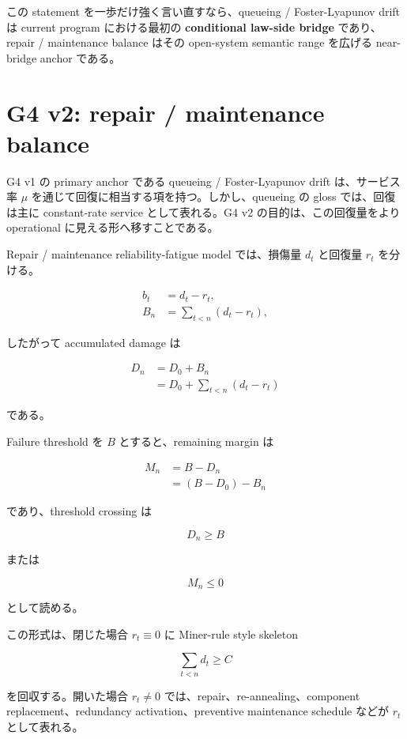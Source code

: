 \documentclass[12pt,a4paper]{article}
\begin{document}
この statement を一歩だけ強く言い直すなら、queueing / Foster-Lyapunov drift は current program における最初の \textbf{conditional law-side bridge} であり、repair / maintenance balance はその open-system semantic range を広げる near-bridge anchor である。

\section{G4 v2: repair / maintenance balance}\label{g4-v2-repair-maintenance-balance}

G4 v1 の primary anchor である queueing / Foster-Lyapunov drift は、サービス率 \(\mu\) を通じて回復に相当する項を持つ。しかし、queueing の gloss では、回復は主に constant-rate service として表れる。G4 v2 の目的は、この回復量をより operational に見える形へ移すことである。

Repair / maintenance reliability-fatigue model では、損傷量 \(d_{t}\) と回復量 \(r_{t}\) を分ける。

\[
\begin{aligned}
b_{t}&=d_{t}-r_{t},\qquad \\
B_{n}&=\sum_{t<n}(d_{t}-r_{t}),
\end{aligned}
\]

したがって accumulated damage は

\[
\begin{aligned}
D_{n} &= D_0 + B_{n} \\
&= D_0 + \sum_{t<n}(d_{t}-r_{t})
\end{aligned}
\]

である。

Failure threshold を \(B\) とすると、remaining margin は

\[
\begin{aligned}
M_{n} &= B-D_{n} \\
&= (B-D_0)-B_{n}
\end{aligned}
\]

であり、threshold crossing は

\[
D_{n} \ge B
\]

または

\[
M_{n} \le 0
\]

として読める。

この形式は、閉じた場合 \(r_{t}\equiv 0\) に Miner-rule style skeleton

\[
\sum_{t<n} d_{t} \ge C
\]

を回収する。開いた場合 \(r_{t}\neq 0\) では、repair、re-annealing、component replacement、redundancy activation、preventive maintenance schedule などが \(r_{t}\) として表れる。
\end{document}
